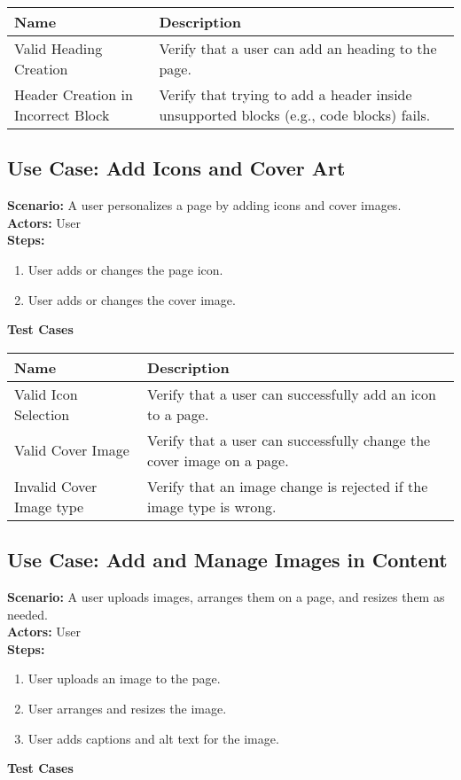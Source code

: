 \documentclass{article}
\begin{document}
            \begin{longtable}{|p{}|p{}|}
            \hline
            \textbf{Name} & \textbf{Description} \\
            \hline
            Valid Heading Creation & Verify that a user can add an heading to the page. \\
\hline
Header Creation in Incorrect Block & Verify that trying to add a header inside unsupported blocks (e.g., code blocks) fails. \\
\hline
\end{longtable}\subsection{\textbf{Use Case: Add Icons and Cover Art}}
\textbf{Scenario:} A user personalizes a page by adding icons and cover images.\\
\textbf{Actors:} User\\
\textbf{Steps:}
\begin{enumerate}
\item User adds or changes the page icon.
\item User adds or changes the cover image.
\end{enumerate}
\textbf{Test Cases}

            \begin{longtable}{|p{}|p{}|}
            \hline
            \textbf{Name} & \textbf{Description} \\
            \hline
            Valid Icon Selection & Verify that a user can successfully add an icon to a page. \\
\hline
Valid Cover Image & Verify that a user can successfully change the cover image on a page. \\
\hline
Invalid Cover Image type & Verify that an image change is rejected if the image type is wrong. \\
\hline
\end{longtable}\subsection{\textbf{Use Case: Add and Manage Images in Content}}
\textbf{Scenario:} A user uploads images, arranges them on a page, and resizes them as needed.\\
\textbf{Actors:} User\\
\textbf{Steps:}
\begin{enumerate}
\item User uploads an image to the page.
\item User arranges and resizes the image.
\item User adds captions and alt text for the image.
\end{enumerate}
\textbf{Test Cases}
\end{document}
